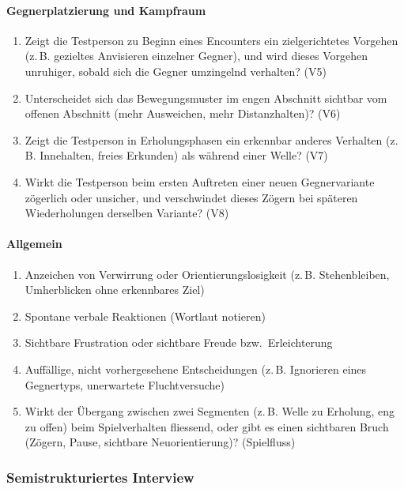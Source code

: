 \documentclass[../Main.tex]{subfiles}
\begin{document}
\paragraph{Gegnerplatzierung und Kampfraum}
\begin{enumerate}[label=\textbf{B\arabic*}, leftmargin=1.5cm, itemsep=0.5em, resume]
    \item Zeigt die Testperson zu Beginn eines Encounters ein zielgerichtetes Vorgehen (z.\,B. gezieltes Anvisieren einzelner Gegner), und wird dieses Vorgehen unruhiger, sobald sich die Gegner umzingelnd verhalten? \hfill (V5)
    \item Unterscheidet sich das Bewegungsmuster im engen Abschnitt sichtbar vom offenen Abschnitt (mehr Ausweichen, mehr Distanzhalten)? \hfill (V6)
    \item Zeigt die Testperson in Erholungsphasen ein erkennbar anderes Verhalten (z.\,B. Innehalten, freies Erkunden) als während einer Welle? \hfill (V7)
    \item Wirkt die Testperson beim ersten Auftreten einer neuen Gegnervariante zögerlich oder unsicher, und verschwindet dieses Zögern bei späteren Wiederholungen derselben Variante? \hfill (V8)
\end{enumerate}

\paragraph{Allgemein}
\begin{enumerate}[label=\textbf{B\arabic*}, leftmargin=1.5cm, itemsep=0.5em, resume]
    \item Anzeichen von Verwirrung oder Orientierungslosigkeit (z.\,B. Stehenbleiben, Umherblicken ohne erkennbares Ziel)
    \item Spontane verbale Reaktionen (Wortlaut notieren)
    \item Sichtbare Frustration oder sichtbare Freude bzw.\ Erleichterung
    \item Auffällige, nicht vorhergesehene Entscheidungen (z.\,B. Ignorieren eines Gegnertyps, unerwartete Fluchtversuche)
    \item Wirkt der Übergang zwischen zwei Segmenten (z.\,B. Welle zu Erholung, eng zu offen) beim Spielverhalten fliessend, oder gibt es einen sichtbaren Bruch (Zögern, Pause, sichtbare Neuorientierung)? \hfill (Spielfluss)
\end{enumerate}

\subsubsection{Semistrukturiertes Interview} \label{sec:Interview}
\end{document}

